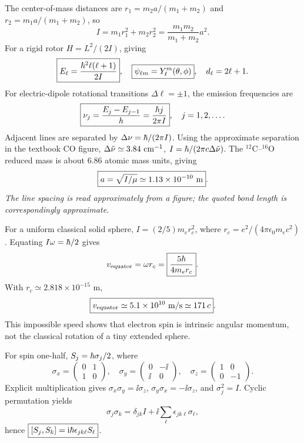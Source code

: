 The center-of-mass distances are
$r_1=m_2a/(m_1+m_2)$ and
$r_2=m_1a/(m_1+m_2)$, so
\begin{equation}
I=m_1r_1^2+m_2r_2^2
=\boxed{\frac{m_1m_2}{m_1+m_2}a^2}.
\end{equation}
For a rigid rotor $H=L^2/(2I)$, giving
\begin{equation}
\boxed{E_\ell=\frac{\hbar^2\ell(\ell+1)}{2I}},
\quad\boxed{\psi_{\ell m}=Y_\ell^m(\theta,\phi)},
\quad d_\ell=2\ell+1.
\end{equation}
For electric-dipole rotational transitions
$\Delta\ell=\pm1$, the emission frequencies are
\begin{equation}
\boxed{\nu_j=\frac{E_j-E_{j-1}}h
=\frac{\hbar j}{2\pi I}},\quad j=1,2,\dots.
\end{equation}
Adjacent lines are separated by
$\Delta\nu=\hbar/(2\pi I)$.
Using the approximate separation in the
textbook CO figure, $\Delta\tilde\nu\simeq
3.84\ {\rm cm^{-1}}$,
$I=\hbar/(2\pi c\Delta\tilde\nu)$.
The $^{12}$C--$^{16}$O reduced mass is
about $6.86$ atomic mass units, giving
\begin{equation}
\boxed{a=\sqrt{I/\mu}\simeq1.13\times10^{-10}\ {\rm m}}.
\end{equation}
\textit{The line spacing is read approximately from a figure;
the quoted bond length is correspondingly approximate.}

For a uniform classical solid sphere,
$I=(2/5)m_er_c^2$, where
$r_c=e^2/(4\pi\epsilon_0m_ec^2)$.
Equating $I\omega=\hbar/2$ gives
\begin{equation}
v_{\rm equator}=\omega r_c
=\boxed{\frac{5\hbar}{4m_er_c}}.
\end{equation}
With $r_c\simeq2.818\times10^{-15}$ m,
\begin{equation}
\boxed{v_{\rm equator}\simeq5.1\times10^{10}
\ {\rm m/s}\simeq171\,c}.
\end{equation}
This impossible speed shows that electron
spin is intrinsic angular momentum, not the
classical rotation of a tiny extended sphere.

For spin one-half, $S_j=\hbar\sigma_j/2$,
where
\begin{equation}
\sigma_x=\begin{pmatrix}0&1\\1&0\end{pmatrix},
\quad\sigma_y=\begin{pmatrix}0&-\ii\\\ii&0\end{pmatrix},
\quad\sigma_z=\begin{pmatrix}1&0\\0&-1\end{pmatrix}.
\end{equation}
Explicit multiplication gives
$\sigma_x\sigma_y=\ii\sigma_z$,
$\sigma_y\sigma_x=-\ii\sigma_z$,
and $\sigma_j^2=I$. Cyclic permutation yields
\begin{equation}
\boxed{\sigma_j\sigma_k=
\delta_{jk}I+\ii\sum_\ell
\epsilon_{jk\ell}\sigma_\ell},
\end{equation}
hence
$\boxed{[S_j,S_k]=\mathrm i\hbar\epsilon_{jk\ell}S_\ell}$.

